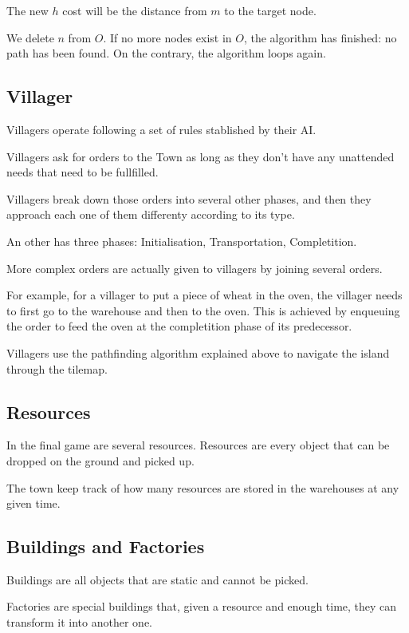 The new $h$ cost will be the distance from $m$ to the target node.

We delete $n$ from $O$. If no more nodes exist in $O$, the algorithm
has finished: no path has been found. On the contrary, the algorithm
loops again.

\subsection{Villager}

Villagers operate following a set of rules stablished by their AI.

Villagers ask for orders to the Town as long as they don't have any unattended
needs that need to be fullfilled.

Villagers break down those orders into several other phases, and then they
approach each one of them differenty according to its type.

An other has three phases: Initialisation, Transportation, Completition.

More complex orders are actually given to villagers by joining several orders.

For example, for a villager to put a piece of wheat in the oven, the villager
needs to first go to the warehouse and then to the oven. This is achieved
by enqueuing the order to feed the oven at the completition phase of its
predecessor.

Villagers use the pathfinding algorithm explained above to navigate the
island through the tilemap.

\subsection{Resources}

In the final game are several resources. Resources are every object that can
be dropped on the ground and picked up.

The town keep track of how many resources are stored in the warehouses at any
given time.

\subsection{Buildings and Factories}

Buildings are all objects that are static and cannot be picked.

Factories are special buildings that, given a resource and enough time,
they can transform it into another one.

